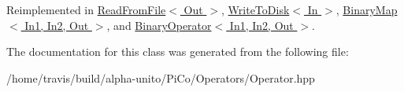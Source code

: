 \-Reimplemented in \hyperlink{class_read_from_file_af509393aad1e80f25fee64991f365bbb}{\-Read\-From\-File$<$ Out $>$}, \hyperlink{class_write_to_disk_a3b57dac20171d5e166210183bceedea2}{\-Write\-To\-Disk$<$ In $>$}, \hyperlink{class_binary_map_a891da29ca1c109f273e6b0448f261783}{\-Binary\-Map$<$ In1, In2, Out $>$}, and \hyperlink{class_binary_operator_a6df8c4e6dee857f27d870c30d4f65920}{\-Binary\-Operator$<$ In1, In2, Out $>$}.



\-The documentation for this class was generated from the following file\-:\begin{DoxyCompactItemize}
\item 
/home/travis/build/alpha-\/unito/\-Pi\-Co/\-Operators/\-Operator.\-hpp\end{DoxyCompactItemize}
